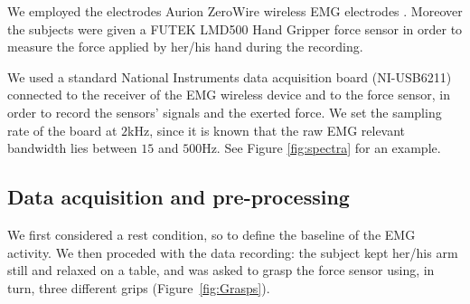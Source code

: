 We employed the electrodes Aurion ZeroWire wireless EMG electrodes
\cite{zerowire}. 
Moreover the subjects were given a FUTEK LMD500 Hand Gripper force
sensor \cite{LMD500} in order to measure the force applied by her/his
hand during the recording.


We used a standard National Instruments data acquisition board
(NI-USB6211) connected to the receiver of the EMG wireless device and
to the force sensor, in order to record the sensors' signals and the
exerted force. We set the sampling rate of the board at $2$kHz, since
it is known that the raw EMG relevant bandwidth lies between $15$ and
$500$Hz. See Figure \ref{fig:spectra} for an example.


\subsection{Data acquisition and pre-processing}
\label{sec:preproc}

We first considered a rest condition, so to define the baseline of the
EMG activity. We then proceded with the data recording:  
%
%
the subject kept her/his arm still and relaxed on a
    table, and was asked to grasp the force sensor using, in turn,
    three different grips (Figure~\ref{fig:Grasps}).
%
%
%

